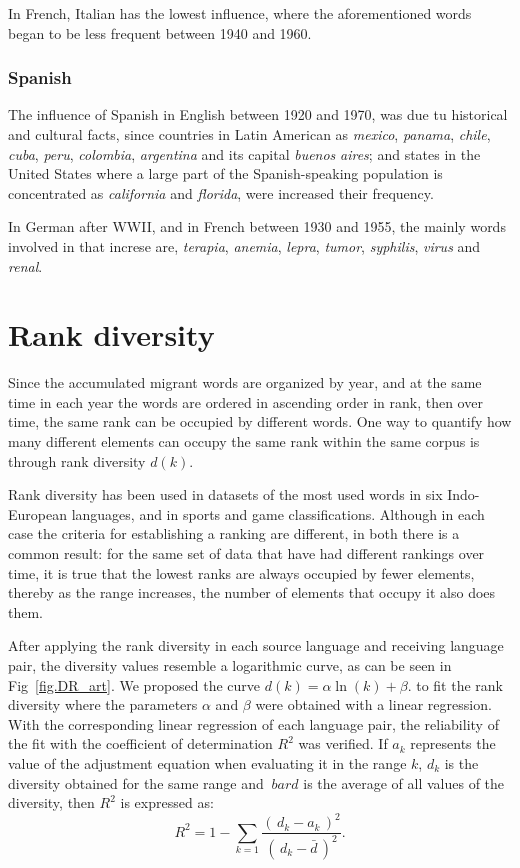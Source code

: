 \documentclass[10pt,letterpaper]{article} %
\begin{document}
In French, Italian has the lowest influence, where the aforementioned words began to be less frequent between 1940 and 1960.
\subsubsection*{Spanish} %

The influence of Spanish in English between 1920 and 1970, was due tu historical and cultural facts, since countries in Latin American as  \textit{mexico}, \textit{panama}, \textit{chile}, \textit{cuba}, \textit{peru}, \textit{colombia}, \textit{argentina} and its capital \textit{buenos} \textit{aires};  and states in the United States  where a large part of the Spanish-speaking population is concentrated as \textit{california} and \textit{florida}, were increased their frequency.

In German after WWII, and in French between 1930 and 1955, the mainly words involved in that increse are, \textit{terapia}, \textit{anemia}, \textit{lepra}, \textit{tumor}, \textit{syphilis}, \textit{virus} and \textit{renal}.

\section*{Rank diversity} %

Since the accumulated migrant words are organized by year, and at the same time in each year the words are ordered in ascending order in rank, then over time, the same rank can be occupied by different words. One way to quantify how many different elements can occupy the same rank within the same corpus is through rank diversity $d(k)$.

Rank diversity has been used in datasets of the most used words in six Indo-European languages, and in sports and game classifications. Although in each case the criteria for establishing a ranking are different, in both there is a common result: for the same set of data that have had different rankings over time, it is true that the lowest ranks are always occupied by fewer elements, thereby as the range increases, the number of elements that occupy it also does them.

After applying the rank diversity in each source language and receiving language pair, the diversity values resemble a logarithmic curve, as can be seen in Fig~\ref{fig.DR_art}. We proposed the curve $d(k) =  \alpha \ln(k) + \beta.$ to fit the rank diversity where the parameters $\alpha$ and $\beta$ were obtained with a linear regression. With the corresponding linear regression of each language pair, the reliability of the fit with the coefficient of determination $R^{2}$ was verified. If $ a_ {k} $ represents the value of the adjustment equation when evaluating it in the range $ k $, $ d_ {k} $ is the diversity obtained for the same range and $ \ bar {d} $ is the average of all values ​​of the diversity, then $R^{2}$ is expressed as:
\begin{equation}
R^{2} = 1 - \sum_{k = 1} \frac{ \left( \,d_{k} - a_{k} \,\right)^{2}  }{ \left( \, d_{k} - \bar{d} \,\right)^{2} }.	
\label{ec.r2_diversidad}
\end{equation}
\end{document}

